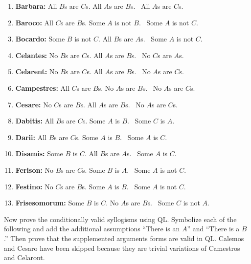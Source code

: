 \begin{enumerate}[label=\arabic*), topsep=0pt, parsep=0pt, itemsep=3pt]
\item \textbf{Barbara:} All $B$s are $C$s. All $A$s are $B$s.
	\therefore\  All $A$s are $C$s.
\item \textbf{Baroco:} All $C$s are $B$s. Some $A$ is not $B$.
	\therefore\  Some $A$ is not $C$.
\item \textbf{Bocardo:} Some $B$ is not $C$. All $B$s are $A$s.
	\therefore\  Some $A$ is not $C$.
\item\textbf{Celantes:} No $B$s are $C$s. All $A$s are $B$s.
	\therefore\  No $C$s are $A$s.
\item\textbf{Celarent:} No $B$s are $C$s. All $A$s are $B$s.
	\therefore\  No $A$s are $C$s.
\item\textbf{Campestres:} All $C$s are $B$s. No $A$s are $B$s.
	\therefore\  No $A$s are $C$s.
\item\textbf{Cesare:} No $C$s are $B$s. All $A$s are $B$s.
	\therefore\  No $A$s are $C$s.
\item\textbf{Dabitis:} All $B$s are $C$s. Some $A$ is $B$.
	\therefore\  Some $C$ is $A$.
\item\textbf{Darii:} All $B$s are $C$s. Some $A$ is $B$.
	\therefore\  Some $A$ is $C$.
\item\textbf{Disamis:} Some $B$ is $C$. All $B$s are $A$s.
	\therefore\  Some $A$ is $C$.
\item\textbf{Ferison:} No $B$s are $C$s. Some $B$ is $A$.
	\therefore\  Some $A$ is not $C$.
\item\textbf{Festino:} No $C$s are $B$s. Some $A$ is $B$.
	\therefore\  Some $A$ is not $C$.
\item\textbf{Frisesomorum:} Some $B$ is $C$. No $A$s are $B$s.
	\therefore\  Some $C$ is not $A$.
\end{enumerate}


\problempart
\label{pr.BarbaraEtc.proof2}
Now prove the conditionally valid syllogisms using QL. Symbolize each of the following and add the additional assumptions ``There is an $A$'' and ``There is a $B$.'' Then prove that the supplemented arguments forms are valid in QL. Calemos and Cesaro have been skipped because they are trivial variations of Camestros and Celaront. 


